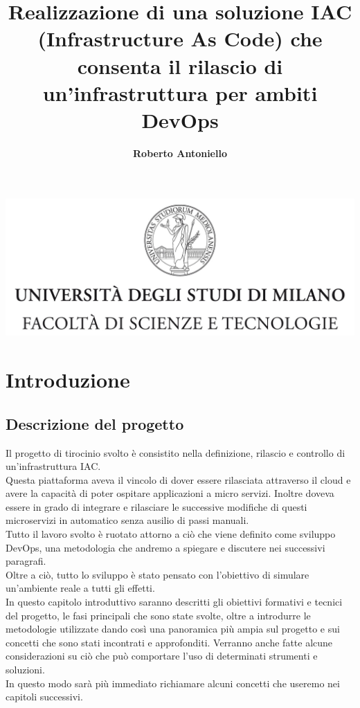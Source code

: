 \documentclass[a4paper,12pt]{report}
\begin{document}
\begin{center}
\includegraphics[width=\textwidth]{Logo.jpg}
\title{Realizzazione di una soluzione IAC (Infrastructure As Code) che consenta il rilascio di un'infrastruttura per ambiti DevOps}
\end{center}
\author{\textbf{Roberto Antoniello}}

\beforepreface

\afterpreface
%  
\chapter{Introduzione}
\section{Descrizione del progetto}
Il progetto di tirocinio svolto è consistito nella definizione, rilascio e controllo di un'infrastruttura IAC.\\
Questa piattaforma aveva il vincolo di dover essere rilasciata attraverso il cloud e avere la capacità di poter ospitare applicazioni a micro servizi. Inoltre doveva essere in grado di integrare e rilasciare le successive modifiche di questi microservizi in automatico senza ausilio di passi manuali.\\
Tutto il lavoro svolto è ruotato attorno a ciò che viene definito come sviluppo DevOps, una metodologia che andremo a spiegare e discutere nei successivi paragrafi. \\
Oltre a ciò, tutto lo sviluppo è stato pensato con l'obiettivo di simulare un'ambiente reale a tutti gli effetti.\\
In questo capitolo introduttivo saranno descritti gli obiettivi formativi e tecnici del progetto, le fasi principali che sono state svolte, oltre a introdurre le metodologie utilizzate dando così una panoramica più ampia sul progetto e sui concetti che sono stati incontrati e approfonditi. 
Verranno anche fatte alcune considerazioni su ciò che può comportare l'uso di determinati strumenti e soluzioni.\\
In questo modo sarà più immediato richiamare alcuni concetti che useremo nei capitoli successivi.
\end{document}

